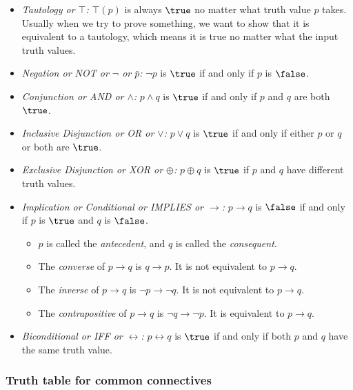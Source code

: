\begin{itemize}
\tightlist
\item
  \emph{Tautology or \(\top\):} \(\top(p)\) is always \(\true\) no
  matter what truth value \(p\) takes. Usually when we try to prove
  something, we want to show that it is equivalent to a tautology, which
  means it is true no matter what the input truth values.
\item
  \emph{Negation or NOT or \(\lnot\) or \(\bar{p}\):} \(\lnot p\) is
  \(\true\) if and only if \(p\) is \(\false\).
\item
  \emph{Conjunction or AND or \(\land\):} \(p \land q\) is \(\true\) if
  and only if \(p\) and \(q\) are both \(\true\).
\item
  \emph{Inclusive Disjunction or OR or \(\lor\):} \(p \lor q\) is
  \(\true\) if and only if either \(p\) or \(q\) or both are \(\true\).
\item
  \emph{Exclusive Disjunction or XOR or \(\oplus\):} \(p \oplus q\) is
  \(\true\) if \(p\) and \(q\) have different truth values.
\item
  \emph{Implication or Conditional or IMPLIES or \(\to\):} \(p \to q\)
  is \(\false\) if and only if \(p\) is \(\true\) and \(q\) is
  \(\false\).

  \begin{itemize}
  \tightlist
  \item
    \(p\) is called the \emph{antecedent}, and \(q\) is called the
    \emph{consequent}.
  \item
    The \emph{converse} of \(p \to q\) is \(q \to p\). It is not
    equivalent to \(p \to q\).
  \item
    The \emph{inverse} of \(p \to q\) is \(\lnot p \to \lnot q\). It is
    not equivalent to \(p \to q\).
  \item
    The \emph{contrapositive} of \(p \to q\) is \(\lnot q \to \lnot p\).
    It is equivalent to \(p \to q\).
  \end{itemize}
\item
  \emph{Biconditional or IFF or \(\leftrightarrow\):}
  \(p \leftrightarrow q\) is \(\true\) if and only if both \(p\) and
  \(q\) have the same truth value.
\end{itemize}

\hypertarget{truth-table-for-common-connectives}{%
\subsubsection{Truth table for common
connectives}\label{truth-table-for-common-connectives}}

